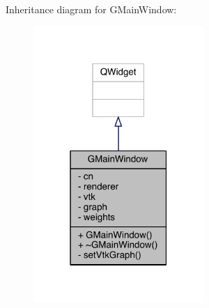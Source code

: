 Inheritance diagram for G\+Main\+Window\+:\nopagebreak
\begin{figure}[H]
\begin{center}
\leavevmode
\includegraphics[width=183pt]{class_g_main_window__inherit__graph}
\end{center}
\end{figure}


